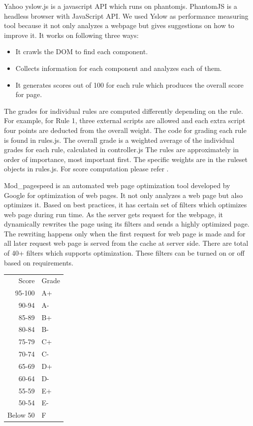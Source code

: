 \documentclass[conference]{IEEEtran}
\begin{document}
Yahoo yslow.js is a javascript API which runs on phantomjs. PhantomJS is a
headless browser with JavaScript API\cite{pjs}. We used Yslow as performance measuring
tool because it not only analyzes a webpage but gives suggestions on how to
improve it. It works on following three ways:
\begin{itemize}
\item It crawls the DOM to find each component.
\item Collects information for each component and analyzes each of them.
\item It generates scores out of 100 for each rule which produces the overall
score for page.
\end{itemize}
The grades for individual rules are computed differently depending on the rule.
For example, for Rule 1, three external scripts are allowed and each extra script
four points are deducted from the overall weight. The code for grading each
rule is found in rules.js. The overall grade is a weighted average of the
individual grades for each rule, calculated in controller.js The rules are
approximately in order of importance, most important first. The specific weights
are in the ruleset objects in rules.js. For score computation please refer \cite{rulematrix}.

Mod\_pagespeed\cite{google:mod-pagespeed} is an automated web page optimization tool developed by Google for
optimization of web pages. It not only
analyzes a web page but also optimizes it. Based on best practices, it has
certain set of filters which optimizes web page during run time. As the server
gets request for the webpage, it dynamically rewrites the page using its filters\cite{pagespeed:filters}
and sends a highly optimized page. The rewriting happens only when the first
request for web page is made and for all later request web page is served from the cache
at server side. There are total of 40+ filters which supports
optimization. These filters can be turned on or off based on requirements. 

% 
% 
% 
% 
% 
\begin{center}
\begin{tabular}{rl}
    Score  &  Grade  \\
   95-100  &  A+     \\
    90-94  &  A-     \\
    85-89  &  B+     \\
    80-84  &  B-     \\
    75-79  &  C+     \\
    70-74  &  C-     \\
    65-69  &  D+     \\
    60-64  &  D-     \\
    55-59  &  E+     \\
    50-54  &  E-     \\
 Below 50  &  F      \\
\end{tabular}
\end{center}
\end{document}
